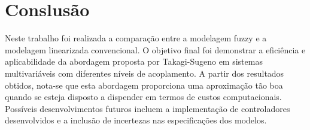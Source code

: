 %

\chapter{Conslusão}
Neste trabalho foi realizada a comparação entre a modelagem fuzzy e a modelagem linearizada convencional. O objetivo final foi demonstrar a eficiência e aplicabilidade da abordagem proposta por Takagi-Sugeno em sistemas multivariáveis com diferentes níveis de acoplamento. A partir dos resultados obtidos, nota-se que esta abordagem proporciona uma aproximação tão boa quando se esteja disposto a dispender em termos de custos computacionais. 
Possíveis desenvolvimentos futuros incluem a implementação de controladores desenvolvidos e a inclusão de incertezas nas especificações dos modelos.

%

